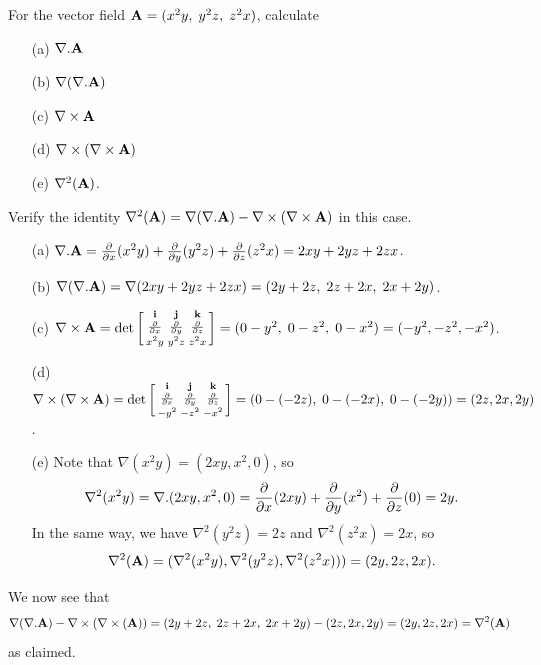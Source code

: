 \documentclass[a4paper]{amsart}
\renewenvironment{solution}{\SolutionInline}{\endSolutionInline}
\begin{document}
\begin{exercise}
 For the vector field $\mathbf{A}=(x^2y,\;y^2z,\;z^2x)$, calculate
 \begin{itemize}
  \item[(a)] $\nabla.\mathbf{A}$
  \item[(b)] $\nabla(\nabla.\mathbf{A})$
  \item[(c)] $\nabla\times\mathbf{A}$
  \item[(d)] $\nabla\times(\nabla\times\mathbf{A})$
  \item[(e)] $\nabla^2(\mathbf{A})$.
 \end{itemize}
 Verify the identity
 $\nabla^2(\mathbf{A})=\nabla(\nabla.\mathbf{A})-\nabla\times(\nabla\times\mathbf{A})$ in this
 case. 
\end{exercise}
\begin{solution}
 \begin{itemize}
  \item[(a)]
   $\nabla.\mathbf{A}=\frac{\partial}{\partial x}(x^2y)+\frac{\partial}{\partial y}(y^2z)+\frac{\partial}{\partial z}(z^2x)=2xy+2yz+2zx$.
  \item[(b)] $\nabla(\nabla.\mathbf{A})=\nabla(2xy+2yz+2zx)=
   (2y+2z,\;2z+2x,\;2x+2y)$.
  \item[(c)] $\nabla\times\mathbf{A}=\det\left[\begin{smallmatrix} \mathbf{i}&\mathbf{j}&\mathbf{k} \\ \frac{\partial}{\partial x}&\frac{\partial}{\partial y}&\frac{\partial}{\partial z} \\
   x^2y& y^2z& z^2x\end{smallmatrix}\right] = (0-y^2,\;0-z^2,\;0-x^2)=(-y^2,-z^2,-x^2)$.
  \item[(d)] $\nabla\times(\nabla\times\mathbf{A})=\det\left[\begin{smallmatrix} \mathbf{i}&\mathbf{j}&\mathbf{k} \\ \frac{\partial}{\partial x}&\frac{\partial}{\partial y}&\frac{\partial}{\partial z} \\
   -y^2& -z^2& -x^2 \end{smallmatrix}\right]=(0-(-2z),\;0-(-2x),\;0-(-2y))=(2z,2x,2y)$.
  \item[(e)] Note that $\nabla(x^2y)=(2xy,x^2,0)$, so 
   \[ \nabla^2(x^2y) = \nabla.(2xy,x^2,0) = 
       \frac{\partial}{\partial x}(2xy) + \frac{\partial}{\partial y}(x^2) +\frac{\partial}{\partial z}(0) = 2y.
   \]
   In the same way, we have $\nabla^2(y^2z)=2z$ and
   $\nabla^2(z^2x)=2x$, so 
   \[ \nabla^2(\mathbf{A})=(\nabla^2(x^2y),\nabla^2(y^2z),\nabla^2(z^2x)))=
       (2y,2z,2x).
   \]
 \end{itemize}
 We now see that 
 \[ \nabla(\nabla.\mathbf{A})-\nabla\times(\nabla\times(\mathbf{A})) =
     (2y+2z,\;2z+2x,\;2x+2y) - (2z,2x,2y) = 
      (2y,2z,2x) = \nabla^2(\mathbf{A})
 \]
 as claimed.
\end{solution}
\end{document}
